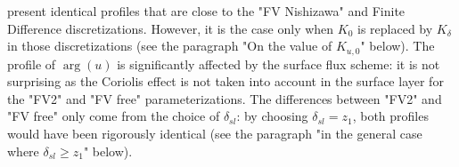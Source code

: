 present identical profiles that are close to the "FV Nishizawa" and
Finite Difference discretizations.
However, it is the case only when $K_0$ is
replaced by $K_{\delta}$ in those discretizations
(see the paragraph "On the value of $K_{u,0}$" below).
The profile of $\arg(u)$ is significantly affected by the surface
flux scheme: it is not surprising as the Coriolis effect is
not taken into account in the surface layer for the "FV2" and
"FV free" parameterizations.
The differences between "FV2" and "FV free" only come from the
choice of $\delta_{sl}$:
by choosing $\delta_{sl}=z_1$, both profiles would have been
rigorously identical
(see the paragraph "in the general case where
$\delta_{sl} \geq z_1$" below).
